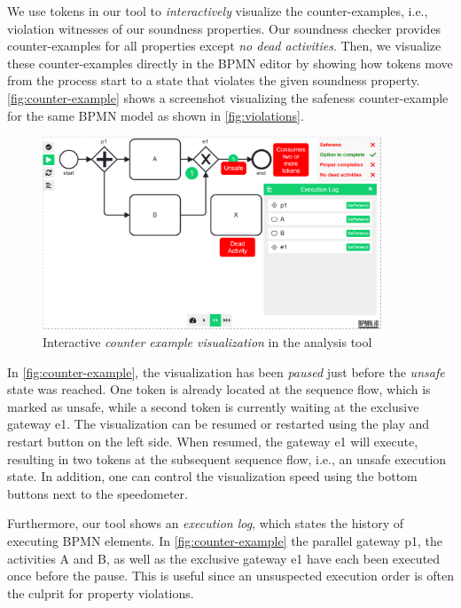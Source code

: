 \documentclass[runningheads]{llncs}
\begin{document}
We use tokens in our tool to \textit{interactively} visualize the counter-examples, i.e., violation witnesses of our soundness properties.
Our soundness checker provides counter-examples for all properties except \textit{no dead activities}.
Then, we visualize these counter-examples directly in the BPMN editor by showing how tokens move from the process start to a state that violates the given soundness property.
\autoref{fig:counter-example} shows a screenshot visualizing the safeness counter-example for the same BPMN model as shown in \autoref{fig:violations}.

\begin{figure}[ht]
	\centering
	\includegraphics[width=0.9\textwidth]{images/counter-example}
	\caption{Interactive \textit{counter example visualization} in the analysis tool}
	\label{fig:counter-example}
\end{figure}

In \autoref{fig:counter-example}, the visualization has been \textit{paused} just before the \textit{unsafe} state was reached.
One token is already located at the sequence flow, which is marked as unsafe, while a second token is currently waiting at the exclusive gateway \textsf{e1}.
The visualization can be resumed or restarted using the play and restart button on the left side.
When resumed, the gateway \textsf{e1} will execute, resulting in two tokens at the subsequent sequence flow, i.e., an unsafe execution state.
In addition, one can control the visualization speed using the bottom buttons next to the speedometer.

Furthermore, our tool shows an \textit{execution log}, which states the history of executing BPMN elements.
In \autoref{fig:counter-example} the parallel gateway \textsf{p1}, the activities \textsf{A} and \textsf{B}, as well as the exclusive gateway \textsf{e1} have each been executed once before the pause.
This is useful since an unsuspected execution order is often the culprit for property violations.
\end{document}
